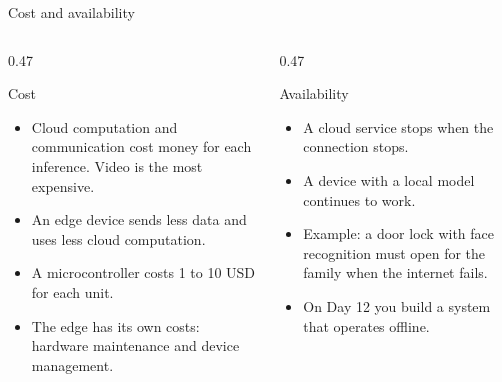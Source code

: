 \begin{frame}{Cost and availability}
  \begin{columns}[T]
    \begin{column}{0.47\textwidth}
      \begin{block}{Cost}
        \begin{itemize}
          \item Cloud computation and communication cost money for each
                inference. Video is the most expensive.
          \item An edge device sends less data and uses less cloud
                computation.
          \item A microcontroller costs 1 to 10 USD for each unit.
          \item The edge has its own costs: hardware maintenance and
                device management.
        \end{itemize}
      \end{block}
    \end{column}
    \begin{column}{0.47\textwidth}
      \begin{block}{Availability}
        \begin{itemize}
          \item A cloud service stops when the connection stops.
          \item A device with a local model continues to work.
          \item Example: a door lock with face recognition must open for
                the family when the internet fails.
          \item On Day 12 you build a system that operates offline.
        \end{itemize}
      \end{block}
    \end{column}
  \end{columns}
\end{frame}

